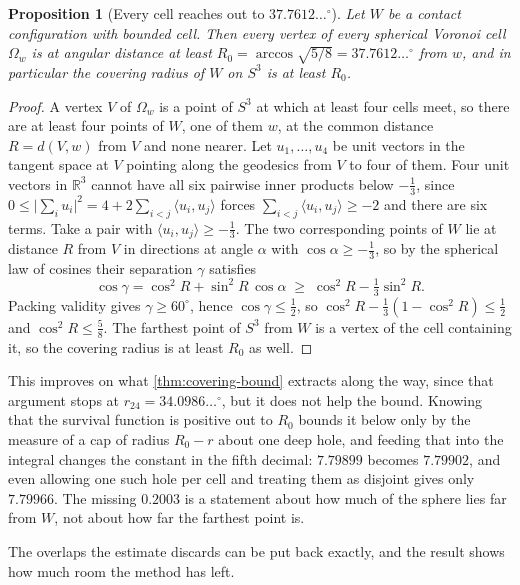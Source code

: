\documentclass[11pt,reqno]{amsart}
\renewcommand{\_}{\origunderscore\allowbreak}
\numberwithin{equation}{section}
\theoremstyle{plain}
\newtheorem{prop}[thm]{Proposition}
\theoremstyle{definition}
\theoremstyle{remark}
\begin{document}
\begin{prop}[Every cell reaches out to $37.7612\ldots^\circ$]\label{prop:covering-radius}
Let $W$ be a contact configuration with bounded cell. Then every vertex
of every spherical Voronoi cell $\Omega_w$ is at angular distance at
least $R_0=\arccos\sqrt{5/8}=37.7612\ldots^\circ$ from $w$, and in
particular the covering radius of $W$ on $S^3$ is at least $R_0$.
\end{prop}

\begin{proof}
A vertex $V$ of $\Omega_w$ is a point of $S^3$ at which at least four
cells meet, so there are at least four points of $W$, one of them $w$,
at the common distance $R=d(V,w)$ from $V$ and none nearer. Let
$u_1,\dots,u_4$ be unit vectors in the tangent space at $V$ pointing
along the geodesics from $V$ to four of them. Four unit vectors in
$\mathbb{R}^3$ cannot have all six pairwise inner products below
$-\tfrac13$, since
$0\le\bigl|\sum_iu_i\bigr|^2=4+2\sum_{i<j}\langle u_i,u_j\rangle$ forces
$\sum_{i<j}\langle u_i,u_j\rangle\ge-2$ and there are six terms. Take a
pair with $\langle u_i,u_j\rangle\ge-\tfrac13$. The two corresponding
points of $W$ lie at distance $R$ from $V$ in directions at angle
$\alpha$ with $\cos\alpha\ge-\tfrac13$, so by the spherical law of
cosines their separation $\gamma$ satisfies
\[
  \cos\gamma=\cos^2R+\sin^2R\,\cos\alpha
  \;\ge\;\cos^2R-\tfrac13\sin^2R .
\]
Packing validity gives $\gamma\ge60^\circ$, hence
$\cos\gamma\le\tfrac12$, so $\cos^2R-\tfrac13(1-\cos^2R)\le\tfrac12$
and $\cos^2R\le\tfrac58$. The farthest point of $S^3$ from $W$ is a
vertex of the cell containing it, so the covering radius is at least
$R_0$ as well.
\end{proof}

This improves on what \cref{thm:covering-bound} extracts along the way,
since that argument stops at $r_{24}=34.0986\ldots^\circ$, but it does not
help the bound. Knowing that the
survival function is positive out to $R_0$ bounds it below only by the
measure of a cap of radius $R_0-r$ about one deep hole, and feeding that
into the integral changes the constant in the fifth decimal:
$7.79899$ becomes $7.79902$, and even allowing one such hole per cell
and treating them as disjoint gives only $7.79966$. The missing
$0.2003$ is a statement about how much of the sphere lies far from $W$,
not about how far the farthest point is.

The overlaps the estimate discards can be put back exactly, and the
result shows how much room the method has left.
\end{document}
